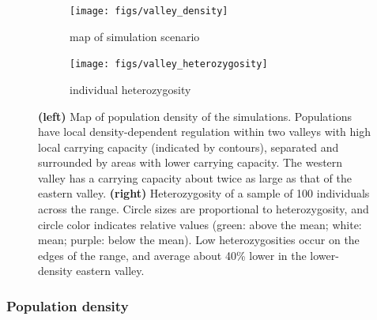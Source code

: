 \documentclass{ar-1col}
\begin{document}
\begin{figure}	%
    \centering
    \begin{subfigure}{0.45\textwidth}
        \centering
        \texttt{[image: figs/valley\_density]}
        \caption{map of simulation scenario}
        \label{valley_map}
    \end{subfigure}
    \begin{subfigure}{0.45\textwidth}
        \centering
        \texttt{[image: figs/valley\_heterozygosity]}
        \caption{individual heterozygosity}
        \label{valley_het}
    \end{subfigure}
        \caption{
            \textbf{(left)} Map of population density of the simulations.
            Populations have local density-dependent regulation
            within two valleys with high local carrying capacity (indicated by contours),
            separated and surrounded by areas with lower carrying capacity.
            The western valley has a carrying capacity about twice as large as that of the eastern valley.
            \textbf{(right)} Heterozygosity of a sample of 100 individuals across the range.
            Circle sizes are proportional to heterozygosity,
            and circle color indicates relative values
            (green: above the mean; white: mean; purple: below the mean).
            Low heterozygosities occur on the edges of the range,
            and average about 40\% lower in the lower-density eastern valley.
		}
        \label{pop_density}
\end{figure}



\subsubsection{Population density}
\end{document}
